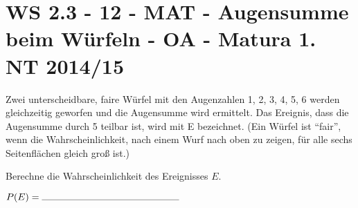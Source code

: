 \section{WS 2.3 - 12 - MAT - Augensumme beim Würfeln - OA - Matura 1. NT 2014/15}

\begin{beispiel}[WS 2.3]{1}
Zwei unterscheidbare, faire Würfel mit den Augenzahlen 1, 2, 3, 4, 5, 6 werden gleichzeitig geworfen und die Augensumme wird ermittelt. Das Ereignis, dass die Augensumme durch 5 teilbar
ist, wird mit E bezeichnet. (Ein Würfel ist "`fair"', wenn die Wahrscheinlichkeit, nach einem Wurf nach oben zu zeigen, für alle sechs Seitenflächen gleich groß ist.) \leer

Berechne die Wahrscheinlichkeit des Ereignisses $E$. \leer

$P(E)= \rule{5cm}{0.3pt}$

\end{beispiel}